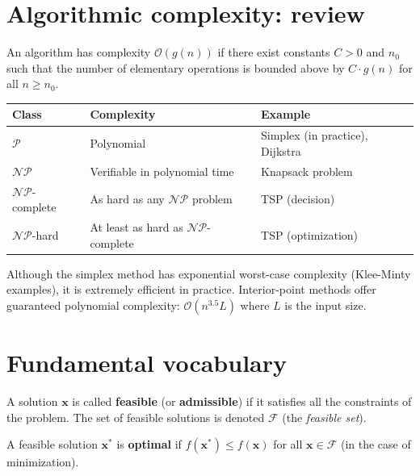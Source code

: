 \section{Algorithmic complexity: review}

\begin{definition}
An algorithm has complexity $\mathcal{O}(g(n))$ if there exist constants
$C > 0$ and $n_0$ such that the number of elementary operations is bounded
above by $C \cdot g(n)$ for all $n \ge n_0$.
\end{definition}

\begin{center}
\renewcommand{\arraystretch}{1.2}
\begin{tabular}{lll}
  \toprule
  \textbf{Class} & \textbf{Complexity} & \textbf{Example} \\
  \midrule
  $\mathcal{P}$ & Polynomial & Simplex (in practice), Dijkstra \\
  $\mathcal{NP}$ & Verifiable in polynomial time & Knapsack problem \\
  $\mathcal{NP}$-complete & As hard as any $\mathcal{NP}$ problem & TSP (decision) \\
  $\mathcal{NP}$-hard & At least as hard as $\mathcal{NP}$-complete & TSP (optimization) \\
  \bottomrule
\end{tabular}
\end{center}

\begin{warning}[title=\textbf{Simplex complexity}]
Although the simplex method has exponential worst-case complexity
(Klee-Minty examples), it is extremely efficient in practice.  Interior-point
methods offer guaranteed polynomial complexity:
$\mathcal{O}(n^{3.5} L)$ where $L$ is the input size.
\end{warning}

\section{Fundamental vocabulary}

\begin{definition}
A solution $\mathbf{x}$ is called \textbf{feasible} (or \textbf{admissible})
if it satisfies all the constraints of the problem.  The set of feasible
solutions is denoted $\mathcal{F}$ (the \textit{feasible set}).
\end{definition}

\begin{definition}
A feasible solution $\mathbf{x}^*$ is \textbf{optimal} if
$f(\mathbf{x}^*) \le f(\mathbf{x})$ for all $\mathbf{x} \in \mathcal{F}$
(in the case of minimization).
\end{definition}

